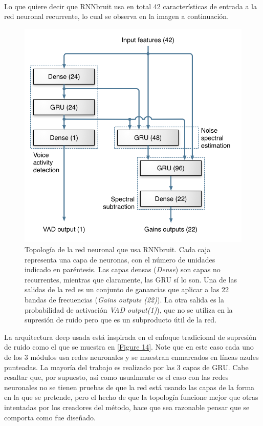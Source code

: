 \documentclass[conference,onecolumn]{IEEEtran}
\begin{document}
\hfill\\
Lo que quiere decir que RNNbruit usa en total 42 características de entrada a la red neuronal recurrente, lo cual se observa en la imagen a continuación.

 \begin{figure}[H]
 \centering
    \includegraphics[scale=0.7]{topology.png}
    \caption{Topología de la red neuronal que usa RNNbruit. Cada caja representa una capa de neuronas, con el número de unidades indicado en paréntesis. Las capas densas (\textit{Dense}) son capas no recurrentes, mientras que claramente, las GRU sí lo son. Una de las salidas de la red es un conjunto de ganancias que aplicar a las 22 bandas de frecuencias (\textit{Gains outputs (22)}). La otra salida es la probabilidad de activación \textit{VAD output(1)}), que no se utiliza en la supresión de ruido pero que es un subproducto útil de la red.} 
\end{figure}

La arquitectura deep usada está inspirada en el enfoque tradicional de supresión de ruido como el que se muestra en \ref{Figure 14}. Note que en este caso cada uno de los 3 módulos usa redes neuronales y se muestran enmarcados en líneas azules punteadas. La mayoría del trabajo es realizado por las 3 capas de GRU. Cabe resaltar que, por supuesto, así como usualmente es el caso con las redes neuronales no se tienen pruebas de que la red está usando las capas de la forma en la que se pretende, pero el hecho de que la topología funcione mejor que otras intentadas por los creadores del método, hace que sea razonable pensar que se comporta como fue diseñado.
\end{document}
